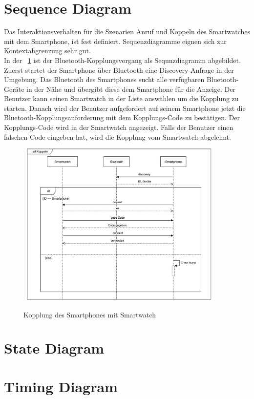 \section{Sequence Diagram}
Das Interaktionsverhalten für die Szenarien Anruf und Koppeln des Smartwatches mit dem Smartphone, ist fest definiert. Sequenzdiagramme eignen sich zur Kontextabgrenzung sehr gut.\\
In der ~\ref{fig:kopplung} ist der Bluetooth-Kopplungsvorgang als Sequnzdiagramm abgebildet.
Zuerst startet der Smartphone über Bluetooth eine Discovery-Anfrage in der Umgebung.
Das Bluetooth des Smartphones sucht alle verfügbaren Bluetooth-Geräte in der Nähe und übergibt diese dem Smartphone für die Anzeige.
Der Benutzer kann seinen Smartwatch in der Liste auswählen um die Kopplung zu starten.
Danach wird der Benutzer aufgefordert auf seinem Smartphone jetzt die Bluetooth-Kopplungsanforderung mit dem Kopplungs-Code zu bestätigen. Der Kopplungs-Code wird in der Smartwatch angezeigt.
Falls der Benutzer einen falschen Code eingeben hat, wird die Kopplung vom Smartwatch 
abgelehnt.

\begin{figure}[H]
\centering\
\includegraphics[width=10cm]{img/KoppelnSequenz}
\caption{Kopplung des Smartphones mit Smartwatch}\label{fig:kopplung}
\end{figure}






\section{State Diagram}

\section{Timing Diagram}

